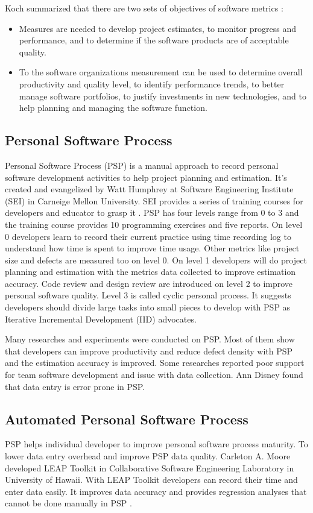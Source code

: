 Koch summarized that there are two sets of objectives of software metrics 
\cite{QPMetricsKoch} :
\begin{itemize}
\item Measures are needed to develop project estimates, to monitor progress
  and performance, and to determine if the software products are of
  acceptable quality.
\item To the software organizations measurement can be used to determine
  overall productivity and quality level, to identify performance trends,
  to better manage software portfolios, to justify investments in new
  technologies, and to help planning and managing the software function. 
\end{itemize}

\subsection{Personal Software Process}
Personal Software Process (PSP) is a manual approach to record personal
software development activities to help project planning and estimation.
It's created and evangelized by Watt Humphrey at Software Engineering
Institute (SEI) in Carneige Mellon University. SEI provides a series of
training courses for developers and educator to grasp it \cite{Humphrey99}.
PSP has four levels range from 0 to 3 and the training course provides 10
programming exercises and five reports. On level 0 developers learn to
record their current practice using time recording log to understand how
time is spent to improve time usage. Other metrics like project size and
defects are measured too on level 0. On level 1 developers will do project
planning and estimation with the metrics data collected to improve
estimation accuracy. Code review and design review are introduced on level
2 to improve personal software quality. Level 3 is called cyclic personal
process. It suggests developers should divide large tasks into small pieces
to develop with PSP as Iterative Incremental Development (IID) advocates.

Many researches and experiments were conducted on PSP. Most of them show
that developers can improve productivity and reduce defect density with PSP
and the estimation accuracy is improved. Some researches reported poor
support for team software development and issue with data collection. Ann
Disney found that data entry is error prone in PSP.

\subsection{Automated Personal Software Process}
PSP helps individual developer to improve personal software process
maturity. To lower data entry overhead and improve PSP data quality.
Carleton A. Moore developed LEAP Toolkit in Collaborative Software
Engineering Laboratory in University of Hawaii. With LEAP Toolkit
developers can record their time and enter data easily. It improves data
accuracy and provides regression analyses that cannot be done manually in
PSP \cite{csdl-99-15}.

